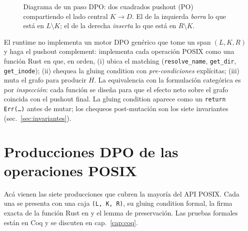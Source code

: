 \begin{figure}[h]
\centering
{}
\caption{Diagrama de un paso DPO: dos cuadrados pushout (PO) compartiendo
el lado central $K \to D$. El de la izquierda \emph{borra} lo que está
en $L \setminus K$; el de la derecha \emph{inserta} lo que está en $R
\setminus K$.}
\label{fig:dpo-square}
\end{figure}

\begin{observacion}
\label{obs:dpo-rust}
El runtime no implementa un motor DPO genérico que tome un span $(L, K,
R)$ y haga el pushout complement: implementa cada operación POSIX como
una función Rust en  que, en orden, (i) ubica el
matching (\texttt{resolve\_name}, \texttt{get\_dir},
\texttt{get\_inode}); (ii) chequea la gluing condition con
\emph{pre-condiciones} explícitas; (iii) muta el grafo para producir
$H$. La equivalencia con la formulación categórica es por
\emph{inspección}: cada función se diseña para que el efecto neto sobre
el grafo coincida con el pushout final. La gluing condition aparece
como un \texttt{return Err(\dots)} antes de mutar; los chequeos
post-mutación son los siete invariantes (sec.~\ref{sec:invariantes}).
\end{observacion}

\section{Producciones DPO de las operaciones POSIX}

Acá vienen las siete producciones que cubren la mayoría del API POSIX.
Cada una se presenta con una caja \texttt{(L, K, R)}, su gluing
condition formal, la firma exacta de la función Rust en
 y el lemma de preservación. Las pruebas formales
están en Coq y se discuten en cap.~\ref{cap:coq}.

